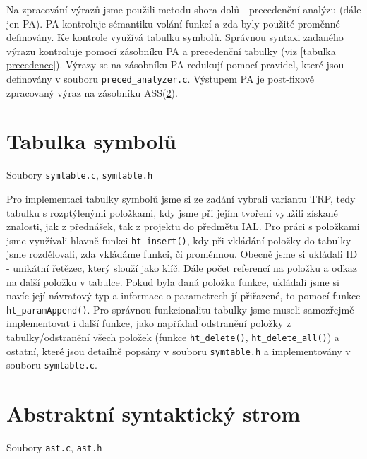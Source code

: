 \documentclass[a4paper, 12pt]{article}
\begin{document}
    Na zpracování výrazů jsme použili metodu shora-dolů - precedenční analýzu (dále jen PA). PA kontroluje sémantiku volání funkcí a zda byly použité proměnné definovány. Ke kontrole využívá tabulku symbolů. Správnou syntaxi zadaného výrazu kontroluje pomocí zásobníku PA a precedenční tabulky (viz \ref{tabulka precedence}). Výrazy se na zásobníku PA redukují pomocí pravidel, které jsou definovány v souboru \texttt{preced\_analyzer.c}. Výstupem PA je post-fixově zpracovaný výraz na zásobníku ASS(\ref{ASS}).

    \section{Tabulka symbolů}
    Soubory \texttt{symtable.c}, \texttt{symtable.h}

    Pro implementaci tabulky symbolů jsme si ze zadání vybrali variantu TRP, tedy tabulku s rozptýlenými položkami, kdy jsme při jejím tvoření využili získané znalosti, jak z přednášek, tak z projektu do předmětu IAL. Pro práci s položkami jsme využívali hlavně funkci \texttt{ht\_insert()}, kdy při vkládání položky do tabulky jsme rozdělovali, zda vkládáme funkci, či proměnnou. Obecně jsme si ukládali ID - unikátní řetězec, který slouží jako klíč. Dále počet referencí na položku a odkaz na další položku v tabulce. Pokud byla daná položka funkce, ukládali jsme si navíc její návratový typ a informace o parametrech jí přiřazené, to pomocí funkce \texttt{ht\_paramAppend()}.
    Pro správnou funkcionalitu tabulky jsme museli samozřejmě implementovat i další funkce, jako například odstranění položky z tabulky/odstranění všech položek (funkce \texttt{ht\_delete()}, \texttt{ht\_delete\_all()}) a ostatní, které jsou detailně popsány v souboru
    \texttt{symtable.h} a implementovány v souboru \texttt{symtable.c}.

    \section{Abstraktní syntaktický strom} \label{ASS}
    Soubory \texttt{ast.c}, \texttt{ast.h}
\end{document}

